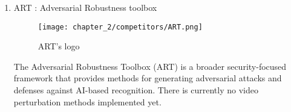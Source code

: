 \begin{enumerate}
        
        \item ART : Adversarial Robustness toolbox
        \begin{figure}[h]
            \centering
            \texttt{[image: chapter\_2/competitors/ART.png]}
            \caption{ART's logo}
        
        \end{figure}
        \par The Adversarial Robustness Toolbox (ART) is a broader security-focused framework that provides methods for generating adversarial attacks and defenses against AI-based recognition.
        There is currently no video perturbation methods implemented yet.

        
    \end{enumerate}

